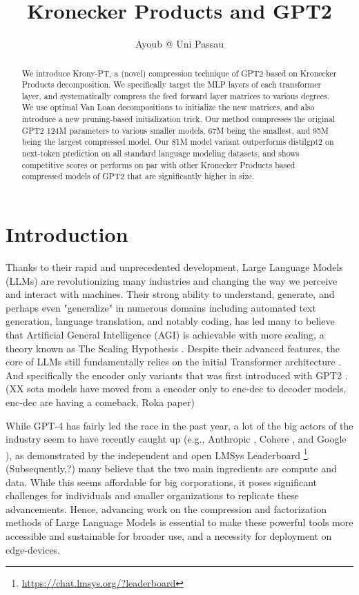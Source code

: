 \documentclass{article}
\title{Kronecker Products and GPT2}
\author{Ayoub @ Uni Passau}
\begin{document}
\maketitle

\begin{abstract}
	We introduce Krony-PT, a (novel) compression technique of GPT2 \cite{radford2019language} based on Kronecker Products decomposition. We specifically target the MLP layers of each transformer layer, and systematically compress the feed forward layer matrices to various degrees. We use optimal Van Loan decompositions to initialize the new matrices, and also introduce a new pruning-based initialization trick. Our method compresses the original GPT2 124M parameters to various smaller models, 67M being the smallest, and 95M being the largest compressed model. Our 81M model variant outperforms distilgpt2 on next-token prediction on all standard language modeling datasets, and shows competitive scores or performs on par with other Kronecker Products based compressed models of GPT2 that are significantly higher in size. 
\end{abstract}

\newpage

\tableofcontents
\newpage

\section{Introduction}
\label{sec:Introduction}

Thanks to their rapid and unprecedented development, Large Language Models (LLMs) are revolutionizing many industries and changing the way we perceive and interact with machines. Their strong ability to understand, generate, and perhaps even "generalize" in numerous domains including automated text generation, language translation, and notably coding, has led many to believe that Artificial General Intelligence (AGI) is achievable with more scaling, a theory known as The Scaling Hypothesis \cite{branwen2021scaling}. Despite their advanced features, the core of LLMs still fundamentally relies on the initial Transformer architecture \cite{vaswani2017attention}. And specifically the encoder only variants that was first introduced with GPT2 \cite{radford2019language}. (XX sota models have moved from a encoder only to enc-dec to decoder models, enc-dec are having a comeback, Roka paper)

While GPT-4 \cite{achiam2023gpt} has fairly led the race in the past year, a lot of the big actors of the industry seem to have recently caught up (e.g., Anthropic \cite{claude3}, Cohere \cite{cmd}, and Google \cite{reid2024gemini}), as demonstrated by the independent and open LMSys Leaderboard \footnote{\href{https://chat.lmsys.org/?leaderboard}{https://chat.lmsys.org/?leaderboard}}. (Subsequently,?) many believe that the two main ingredients are compute and data. While this seems affordable for big corporations, it poses significant challenges for individuals and smaller organizations to replicate these advancements. Hence, advancing work on the compression and factorization methods of Large Language Models is essential to make these powerful tools more accessible and sustainable for broader use, and a necessity for deployment on edge-devices.
\end{document}
